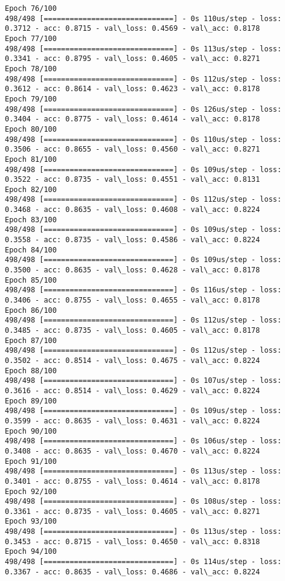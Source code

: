 \documentclass[11pt]{article}
\begin{document}
\begin{Verbatim}[commandchars=\\\{\}]
Epoch 76/100
498/498 [==============================] - 0s 110us/step - loss: 0.3712 - acc: 0.8715 - val\_loss: 0.4569 - val\_acc: 0.8178
Epoch 77/100
498/498 [==============================] - 0s 113us/step - loss: 0.3341 - acc: 0.8795 - val\_loss: 0.4605 - val\_acc: 0.8271
Epoch 78/100
498/498 [==============================] - 0s 112us/step - loss: 0.3612 - acc: 0.8614 - val\_loss: 0.4623 - val\_acc: 0.8178
Epoch 79/100
498/498 [==============================] - 0s 126us/step - loss: 0.3404 - acc: 0.8775 - val\_loss: 0.4614 - val\_acc: 0.8178
Epoch 80/100
498/498 [==============================] - 0s 110us/step - loss: 0.3506 - acc: 0.8655 - val\_loss: 0.4560 - val\_acc: 0.8271
Epoch 81/100
498/498 [==============================] - 0s 109us/step - loss: 0.3522 - acc: 0.8735 - val\_loss: 0.4551 - val\_acc: 0.8131
Epoch 82/100
498/498 [==============================] - 0s 112us/step - loss: 0.3468 - acc: 0.8635 - val\_loss: 0.4608 - val\_acc: 0.8224
Epoch 83/100
498/498 [==============================] - 0s 109us/step - loss: 0.3558 - acc: 0.8735 - val\_loss: 0.4586 - val\_acc: 0.8224
Epoch 84/100
498/498 [==============================] - 0s 109us/step - loss: 0.3500 - acc: 0.8635 - val\_loss: 0.4628 - val\_acc: 0.8178
Epoch 85/100
498/498 [==============================] - 0s 116us/step - loss: 0.3406 - acc: 0.8755 - val\_loss: 0.4655 - val\_acc: 0.8178
Epoch 86/100
498/498 [==============================] - 0s 112us/step - loss: 0.3485 - acc: 0.8735 - val\_loss: 0.4605 - val\_acc: 0.8178
Epoch 87/100
498/498 [==============================] - 0s 112us/step - loss: 0.3502 - acc: 0.8514 - val\_loss: 0.4675 - val\_acc: 0.8224
Epoch 88/100
498/498 [==============================] - 0s 107us/step - loss: 0.3616 - acc: 0.8514 - val\_loss: 0.4629 - val\_acc: 0.8224
Epoch 89/100
498/498 [==============================] - 0s 109us/step - loss: 0.3599 - acc: 0.8635 - val\_loss: 0.4631 - val\_acc: 0.8224
Epoch 90/100
498/498 [==============================] - 0s 106us/step - loss: 0.3408 - acc: 0.8635 - val\_loss: 0.4670 - val\_acc: 0.8224
Epoch 91/100
498/498 [==============================] - 0s 113us/step - loss: 0.3401 - acc: 0.8755 - val\_loss: 0.4614 - val\_acc: 0.8178
Epoch 92/100
498/498 [==============================] - 0s 108us/step - loss: 0.3361 - acc: 0.8735 - val\_loss: 0.4605 - val\_acc: 0.8271
Epoch 93/100
498/498 [==============================] - 0s 113us/step - loss: 0.3453 - acc: 0.8715 - val\_loss: 0.4650 - val\_acc: 0.8318
Epoch 94/100
498/498 [==============================] - 0s 114us/step - loss: 0.3367 - acc: 0.8635 - val\_loss: 0.4686 - val\_acc: 0.8224

\end{Verbatim}
\end{document}

